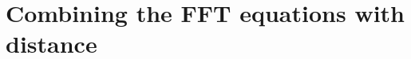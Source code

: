 \documentclass[twocolumn]{article}
\begin{document}
\section{Combining the FFT equations with distance}
\begin{comment}
When dealing with spatial data, such as brain imaging where functional connectivity is of interest, and you want to incorporate distance information into your analysis, you can combine spatial distance metrics with FFT-based correlation measures. Here's how you might integrate these concepts:
1. **Spatial Distance Metric:**
Define a distance metric for the locations (e.g., voxels, regions of interest) in your dataset. If you're
considering two points on the surface of a sphere (like the brain), you can use geodesic or great-circle distances. These are the shortest paths over the surface of the sphere and can be computed using spherical trigonometry or by leveraging libraries that handle spatial data, such as `geopandas` in Python.
2. **Normalizing by Distance:**
To account for the physical distance between brain regions, you can normalize your correlation measures
by the inverse of the distance between the two points of interest. This step is crucial to ensure that the correlation measure reflects both the functional connectivity and the attenuation effect due to increased distance. The normalization can be done as follows:
\[ \text{Normalized Correlation}(d) = \frac{\text{Correlation}}{d(x, y)} \]
where \( d(x, y) \) is the distance between two points \( x \) and \( y \). This normalization can be applied after computing the pairwise correlation of FFT outputs or other functional connectivity measures.
3. **Pairwise FFT Correlation with Distance Normalization:**
Let's assume you have computed the FFT for each brain region (or time series) separately, and now you
want to assess the correlation between the frequency representations of two regions. You would calculate
the correlation coefficient (e.g., Pearson correlation, cross-correlation, etc.) between the complex vectors representing the FFT outputs of these two regions. Then, you apply the distance normalization:
\[ \text{Normalized FFT Correlation}(f; d) = \frac{\sum_{k} x_1(k, f) \cdot x_2(k, f)^*}{\|x_1(f)\| \|x_2(f)\| \cdot d(x, y)} \]
where \( x_1(k, f) \) and \( x_2(k, f) \) are the FFT coefficients of the first and second region at frequency \( f \), respectively, \( k \) is the discrete frequency bin, \( \|x_1(f)\| \) and \( \|x_2(f)\| \) are the norms (magnitudes) of the FFT outputs, and \( d(x, y) \) is the distance between the two regions.

\end{comment}
\end{document}
